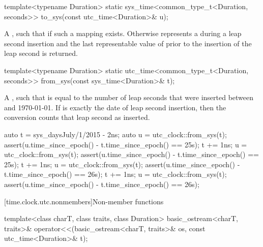 %
\begin{itemdecl}
template<typename Duration>
  static sys_time<common_type_t<Duration, seconds>>
    to_sys(const utc_time<Duration>& u);
\end{itemdecl}

\begin{itemdescr}
\pnum
\returns
A  ,
such that  if such a mapping exists.
Otherwise  represents a 
during a leap second insertion
and the last representable value of 
prior to the insertion of the leap second is returned.
\end{itemdescr}

%
\begin{itemdecl}
template<typename Duration>
  static utc_time<common_type_t<Duration, seconds>>
    from_sys(const sys_time<Duration>& t);
\end{itemdecl}

\begin{itemdescr}
\pnum
\returns
A  , such that
is equal to the number of leap seconds that were inserted
between  and 1970-01-01.
If  is exactly the date of leap second insertion,
then the conversion counts that leap second as inserted.

\begin{example}
\begin{codeblock}
auto t = sys_days{July/1/2015} - 2ns;
auto u = utc_clock::from_sys(t);
assert(u.time_since_epoch() - t.time_since_epoch() == 25s);
t += 1ns;
u = utc_clock::from_sys(t);
assert(u.time_since_epoch() - t.time_since_epoch() == 25s);
t += 1ns;
u = utc_clock::from_sys(t);
assert(u.time_since_epoch() - t.time_since_epoch() == 26s);
t += 1ns;
u = utc_clock::from_sys(t);
assert(u.time_since_epoch() - t.time_since_epoch() == 26s);
\end{codeblock}
\end{example}
\end{itemdescr}

[time.clock.utc.nonmembers]{Non-member functions}

%
\begin{itemdecl}
template<class charT, class traits, class Duration>
  basic_ostream<charT, traits>&
    operator<<(basic_ostream<charT, traits>& os, const utc_time<Duration>& t);
\end{itemdecl}

